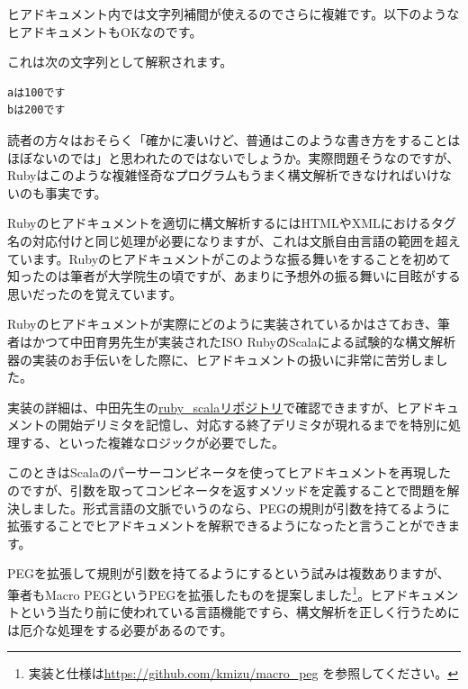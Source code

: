 ヒアドキュメント内では文字列補間が使えるのでさらに複雑です。以下のようなヒアドキュメントもOKなのです。

\begin{Shaded}
\begin{Highlighting}[]
\end{Highlighting}
\end{Shaded}

これは次の文字列として解釈されます。

\begin{verbatim}
aは100です
bは200です
\end{verbatim}

読者の方々はおそらく「確かに凄いけど、普通はこのような書き方をすることはほぼないのでは」と思われたのではないでしょうか。実際問題そうなのですが、Rubyはこのような複雑怪奇なプログラムもうまく構文解析できなければいけないのも事実です。

Rubyのヒアドキュメントを適切に構文解析するにはHTMLやXMLにおけるタグ名の対応付けと同じ処理が必要になりますが、これは文脈自由言語の範囲を超えています。Rubyのヒアドキュメントがこのような振る舞いをすることを初めて知ったのは筆者が大学院生の頃ですが、あまりに予想外の振る舞いに目眩がする思いだったのを覚えています。

Rubyのヒアドキュメントが実際にどのように実装されているかはさておき、筆者はかつて中田育男先生が実装されたISO
RubyのScalaによる試験的な構文解析器の実装のお手伝いをした際に、ヒアドキュメントの扱いに非常に苦労しました。

実装の詳細は、中田先生の\href{https://github.com/inakata/ruby_scala/blob/3f54cc6f80678e30a211fb1374280246f08182ed/src/main/scala/com/github/inakata/ruby_scala/Ruby.scala\#L1383}{ruby\_scalaリポジトリ}で確認できますが、ヒアドキュメントの開始デリミタを記憶し、対応する終了デリミタが現れるまでを特別に処理する、といった複雑なロジックが必要でした。

このときはScalaのパーサーコンビネータを使ってヒアドキュメントを再現したのですが、引数を取ってコンビネータを返すメソッドを定義することで問題を解決しました。形式言語の文脈でいうのなら、PEGの規則が引数を持てるように拡張することでヒアドキュメントを解釈できるようになったと言うことができます。

PEGを拡張して規則が引数を持てるようにするという試みは複数ありますが、筆者もMacro
PEGというPEGを拡張したものを提案しました\footnote{実装と仕様は\url{https://github.com/kmizu/macro_peg}
  を参照してください。}。ヒアドキュメントという当たり前に使われている言語機能ですら、構文解析を正しく行うためには厄介な処理をする必要があるのです。

